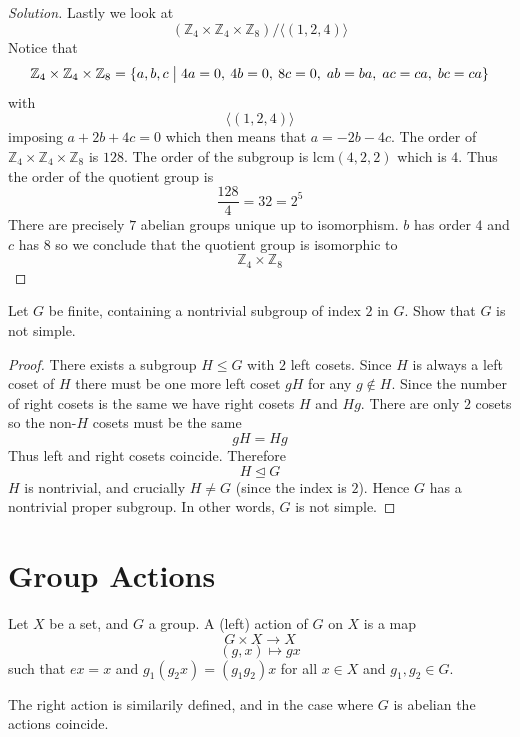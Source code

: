 \begin{proof}[Solution]
    Lastly we look at 
    \[
        (\mathbb Z_4 \times \mathbb Z_4 \times \mathbb Z_8)/
        \langle (1,2,4) \rangle
    \]
    Notice that 
    \[
        \mathbb Z_4 \times \mathbb Z_4 \times \mathbb Z_8 
        = \{a,b,c \bigm| 4a = 0, \: 4b = 0, \: 8c = 0, \; 
        ab = ba, \; ac = ca, \; bc = ca\}
    \]
    with 
    \[
        \langle (1,2,4) \rangle
    \]
    imposing $a + 2b + 4c = 0$ which then means that 
    $a = -2b -4c$. The order of $\mathbb Z_4 \times 
    \mathbb Z_4 \times \mathbb Z_8$ is $128$. The order
    of the subgroup is $\text{lcm}(4, 2, 2)$ which is $4$. 
    Thus the order of the quotient group is 
    \[
        \frac{128}{4} = 32 = 2^5
    \]
    There are precisely $7$ abelian groups unique up to isomorphism.
    $b$ has order $4$ and $c$ has $8$ so we conclude that 
    the quotient group is isomorphic to 
    \[
        \mathbb Z_4 \times \mathbb Z_8 
    \]
\end{proof}
\begin{prob}
    Let $G$ be finite, containing a nontrivial subgroup of index $2$
    in $G$. Show that $G$ is not simple. 
\end{prob}
\begin{proof}
    There exists a subgroup $H \leq G$ with 
    $2$ left cosets. Since $H$ is always a left coset of $H$ there 
    must be one more left coset $gH$ for any $g \not\in H$. 
    Since the number of right cosets is the same we 
    have right cosets $H$ and $Hg$. There are only $2$ cosets 
    so the non-$H$ cosets must be the same 
    \[
        gH = Hg
    \]
    Thus left and right cosets coincide. Therefore 
    \[
        H \trianglelefteq G
    \]
    $H$ is nontrivial, and crucially $H \neq G$ (since the index 
    is $2$). Hence $G$ has a nontrivial proper subgroup. 
    In other words, $G$ is not simple. 
\end{proof}

\newpage 
\section{Group Actions}
\begin{defn}
    Let $X$ be a set, and $G$ a group. A (left) action of $G$ on $X$ 
    is a map 
    \[
        G \times X \to X 
    \]
    \[
        (g,x) \mapsto gx
    \]
    such that $ex = x$ and $g_1(g_2x) = (g_1g_2)x$ for all 
    $x \in X$ and $g_1,g_2 \in G$.
\end{defn}
The right action is similarily defined, and in the case where 
$G$ is abelian the actions coincide. 

